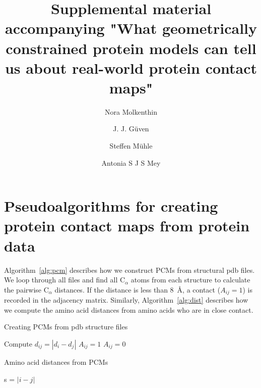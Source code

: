 \documentclass[notitlepage,
reprint,%
onecolumn,
amsmath,amssymb,superscriptaddress,aps,
pre,floatfix]{revtex4-1}
\begin{document}
\title{Supplemental material accompanying "What geometrically constrained protein models can tell us about real-world protein contact maps"}
\author{Nora Molkenthin}
\author{J. J.  Güven}
\author{Steffen Mühle}
\author{Antonia S J S Mey}
\maketitle

\section*{Pseudoalgorithms for creating protein contact maps from protein data}

Algorithm~\ref{alg:pcm} describes how we construct PCMs from structural pdb files. We loop through all files and find all C$_\alpha$ atoms from each structure to calculate the pairwise C$_\alpha$ distances. If the distance is less than 8~Å, a contact ($A_{ij}=1$) is recorded in the adjacency matrix. Similarly, Algorithm~\ref{alg:dist} describes how we compute the amino acid distances from amino acids who are in close contact.
 
\begin{algorithm}[htb]
\caption{Creating PCMs from pdb structure files}\label{alg:pcm}
\begin{algorithmic}[1]
\State Compute $d_{ij}=|d_i-d_j|$ 
    \State \texttt{$A_{ij}=1$} 
\Else
    \State \texttt{$A_{ij}=0$} 
\EndIf
\EndFor
\EndFor
\end{algorithmic}
\end{algorithm}

\begin{algorithm}[htb]
\caption{Amino acid distances from PCMs}\label{alg:dist}
\begin{algorithmic}[1]
 
    \State s = $|i - j|$
\EndIf
\EndFor
\EndFor
\end{algorithmic}
\end{algorithm}
\end{document}
